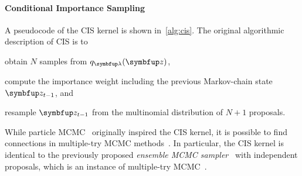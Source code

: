\vspace{-0.1in}
\paragraph{Conditional Importance Sampling}
A pseudocode of the CIS kernel is shown in~\cref{alg:cis}.
The original algorithmic description of CIS is to
\begin{enumerate*}[label=(\roman*)]
  \item obtain \(N\) samples from \(q_{\vlambda}(\vz)\),
  \item compute the importance weight including the previous Markov-chain state \(\vz_{t-1}\), and 
  \item resample \(\vz_{t-1}\) from the multinomial distribution of \(N+1\) proposals.
\end{enumerate*}
%
While particle MCMC~\citep{andrieu_particle_2010} originally inspired the CIS kernel, it is possible to find connections in multiple-try MCMC methods~\citep{martino_review_2018}.
In particular, the CIS kernel is identical to the previously proposed \textit{ensemble MCMC sampler}~\citep{austad_parallel_2007, neal_mcmc_2011a} with independent proposals, which is an instance of multiple-try MCMC~\citep[Table 12]{martino_review_2018}.

\vspace{-0.1in}
